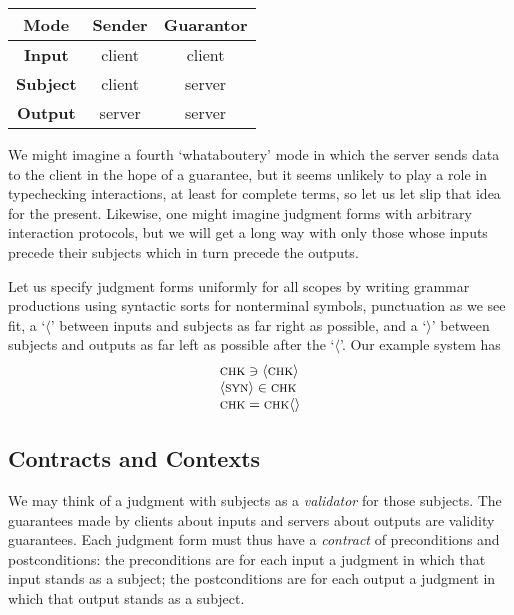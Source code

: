 \documentclass[format=acmsmall, screen, review, anonymous, timestamp]{acmart}
\begin{document}
\begin{tabular}{|c||c|c|}
  \hline
  \textbf{Mode} & \textbf{Sender} & \textbf{Guarantor} \\
  \hline \hline
  \textbf{Input} & client & client \\
  \textbf{Subject} & client & server \\
  \textbf{Output} & server & server \\
  \hline
\end{tabular}

We might imagine a fourth `whataboutery' mode in which the server sends data to the client in the hope of a guarantee, but it seems unlikely to play a role in typechecking interactions, at least for complete terms, so let us let slip that idea for the present. Likewise, one might imagine judgment forms with arbitrary interaction protocols, but we will get a long way with only those whose inputs precede their subjects which in turn precede the outputs.

Let us specify judgment forms uniformly for all scopes by writing grammar productions using syntactic sorts for nonterminal symbols, punctuation as we see fit, a `$\langle$' between inputs and subjects as far right as possible, and a `$\rangle$' between subjects and outputs as far left as possible after the `$\langle$'. Our example system has
\[\begin{array}{l}
    \textsc{chk} \ni \langle \textsc{chk} \rangle \\
    \langle \textsc{syn} \rangle \in \textsc{chk} \\
    \textsc{chk} = \textsc{chk} \langle\rangle 
  \end{array}\]


\subsection{Contracts and Contexts}

We may think of a judgment with subjects as a \emph{validator} for those subjects. The guarantees made by clients about inputs and servers about outputs are validity guarantees. Each judgment form must thus have a \emph{contract} of preconditions and postconditions: the preconditions are for each input a judgment in which that input stands as a subject; the postconditions are for each output a judgment in which that output stands as a subject.
\end{document}
